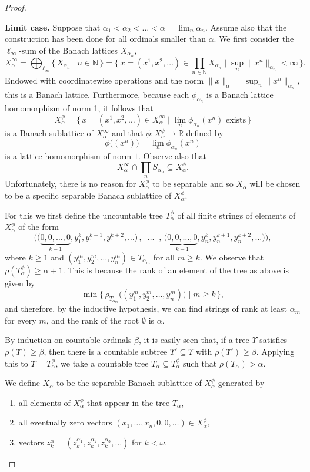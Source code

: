 \documentclass[10pt,a4paper]{amsart}
\newcommand{\MGd}[2]{\Big\{ \, {#1}\;\Big|\; {#2} \,\Big\} }
\newcommand{\Mgd}[2]{\big\{\,  {#1}\;\big|\; {#2} \,\big\} }
\newcommand {\N}{\mathbb N}
\newcommand {\R}{\mathbb R}
\begin{document}
\begin{proof}
	
	\
	
{\bf Limit case.} Suppose that $\alpha_1 <\alpha_2 < \ldots<\alpha = \lim_n \alpha_n$. Assume also that the construction has been done for all ordinals smaller than $\alpha$. We first consider the $\ell_\infty$-sum of the Banach lattices $X_{\alpha_n}$,
$$
X^\infty_\alpha 
= \bigoplus_{\ell_\infty}\MGd{X_{\alpha_n} }{ n\in \N} 
= \MGd{x=(x^1,x^2,\ldots)\in \prod_{n\in \N}X_{\alpha_n} }
{ \sup_n\|x^n\|_{\alpha_n}<\infty}.
$$
Endowed with coordinatewise operations and the norm $\|x\|_\alpha = \sup_n \|x^n\|_{\alpha_n}$, this is a Banach lattice. Furthermore, because each $\phi_{\alpha_n}$ is a Banach lattice homomorphism of norm 1, it follows that 
$$
X^\phi_\alpha =\MGd{x=(x^1,x^2,\ldots)\in X^\infty_\alpha }{ \lim_n \phi_{\alpha_n}(x^n) \text{ exists}}
$$ 
is a Banach sublattice of $X^\infty_\alpha$ and that $\phi\colon X^\phi_\alpha\to \R$ defined by
$$
\phi\big((x^n)\big)=\lim_n\phi_{\alpha_n}(x^n)
$$
is a lattice homomorphism of norm $1$. Observe also that $$X^\infty_\alpha\cap \prod_n S_{\alpha_n}\subseteq X^\phi_\alpha.
$$
Unfortunately, there is no reason for $X^\phi_\alpha$ to be separable and so $X_\alpha$ will be chosen to be a specific  separable Banach sublattice of $X^\phi_\alpha$. 


For this we first define the uncountable tree
$T^\phi_\alpha$ of all finite strings of elements of $X^\phi_\alpha$ of the form 
$$
\Big(
\big(\underbrace{0,0,\ldots,0}_{k-1},{y_1^k},{y_1^{k+1}},{y_1^{k+2}},\ldots\big)
\,,\;\; \ldots\;\; , \, 
\big(\underbrace{0,0,\ldots,0}_{k-1},{y_n^k},{y_n^{k+1}},{y_n^{k+2}},\ldots\big)
\Big),
$$
where $k\geqslant 1$ and $(y_1^m,y_2^m,\ldots, y_n^m)\in T_{\alpha_m}$ for all $m\geqslant k$. We observe that $\rho(T^\phi_\alpha)\geqslant \alpha+1.$ 
This is because the rank of an element of the tree as above is given by 
$$
\min\Mgd{\rho_{T_{\alpha_m}}\big((y_1^m,y_2^m,\ldots, y_n^m)\big) } { m\geqslant k},
$$ 
and therefore, by the inductive hypothesis, we can find strings of rank at least $\alpha_m$ for every $m$, and the rank of the root $\emptyset$ is $\alpha$. 

By induction on countable ordinals $\beta$, it is easily seen that, if a tree $\Upsilon$ satisfies $\rho(\Upsilon)\geqslant \beta$, then there is a countable subtree $\Upsilon'\subseteq \Upsilon$ with $\rho(\Upsilon')\geqslant \beta$. 
Applying this to $\Upsilon=T^\phi_\alpha$, we take a countable tree $T_\alpha\subseteq T^\phi_\alpha$ such that $\rho(T_\alpha)>\alpha$.

We define $X_\alpha$ to be the separable Banach sublattice of $X^\phi_\alpha$ generated by 
\begin{enumerate}
    \item all elements of $X^\phi_\alpha$ that appear in the tree $T_\alpha$, 
    \item all eventually zero vectors $(x_1,\ldots,x_n,0,0,\ldots)\in X^\phi_\alpha$,
    \item vectors $z^\alpha_k = \left({z^{\alpha_1}_k},{z^{\alpha_2}_k},{z^{\alpha_3}_k},\ldots\right)$ for  $k<\omega$.  
\end{enumerate}



\end{proof}
\end{document}
